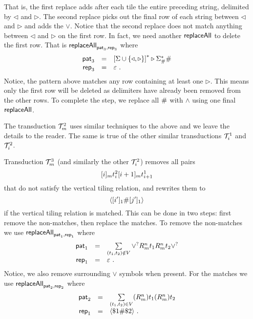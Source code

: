 That is, the first replace adds after each tile the entire preceding string,
delimited by $\triangleleft$ and $\triangleright$. The second replace picks out
the final row of each string between $\triangleleft$ and $\triangleright$ and
adds the $\lor$. Notice that the second replace does not match anything between
$\triangleleft$ and $\triangleright$ on the first row. In fact, we need another
$\replaceall$ to delete the first row. That is $\replaceall_{\pat_3, \rep_3}$
where
\[
    \begin{array}{rcl}
        \pat_3 &=& \rebrac{
            \alphabet \cup \set{\triangleleft, \triangleright}
            }^\ast \triangleright \alphabet_\spacer^\ast \spacer \\
        \rep_3 &=& \varepsilon \ .
    \end{array}
\]
Notice, the pattern above matches any row containing at least one
$\triangleright$. This means only the first row will be deleted as delimiters
have already been removed from the other rows.  To complete the step, we
replace all $\spacer$ with $\land$ using one final $\replaceall$.

The transduction $\psst^2_\expheight$ uses similar techniques to the above and
we leave the details to the reader. The same is true of the other similar
transductions $\psst^1_{\idxi}$ and $\psst^2_{\idxi}$.

Transduction $\psst^3_\expheight$ (and similarly the other $\psst^2_\idxi$)
removes all pairs
\[
    \tenc{\expheight}{\idxi} \tile^2_\idxi
    \tenc{\expheight}{\idxi + 1} \tile^1_{\idxi+1}
\]
that do not satisfy the vertical tiling relation, and rewrites them to
\[
    \lmark
        \tenc{1}{\idxi'} \spacer \tenc{1}{\idxj'}
    \rmark
\]
if the vertical tiling relation is matched. This can be done in two steps:
first remove the non-matches, then replace the matches. To remove the
non-matches we use $\replaceall_{\pat_1, \rep_1}$ where
\[
    \begin{array}{rcl}
        \pat_1 &=& \sum\limits_{\tup{\tile_1, \tile_2} \notin \vrel}
            \lor^?
            \isnum{\expheight}{\linlen} \tile_1
            \isnum{\expheight}{\linlen} \tile_2
            \lor^? \\
        \rep_1 &=& \varepsilon \ .
    \end{array}
\]
Notice, we also remove surrounding $\lor$ symbols when present.
For the matches we use $\replaceall_{\pat_2, \rep_2}$ where
\[
    \begin{array}{rcl}
        \pat_2 &=& \sum\limits_{\tup{\tile_1, \tile_2} \in \vrel}
            (\isnum{\expheight}{\linlen}) \tile_1
            (\isnum{\expheight}{\linlen}) \tile_2 \\
        \rep_1 &=& \langle \$1 \spacer \$2 \rangle \ .
    \end{array}
\]

